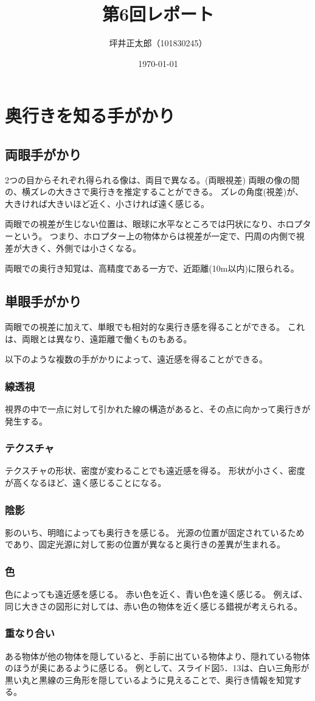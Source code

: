 \documentclass[a4paper,10pt]{jsarticle}
\begin{document}
\title{第6回レポート}
\author{坪井正太郎（101830245）}
\date{\today}
\maketitle
\section{奥行きを知る手がかり}
\subsection{両眼手がかり}
2つの目からそれぞれ得られる像は、両目で異なる。(両眼視差)
両眼の像の間の、横ズレの大きさで奥行きを推定することができる。
ズレの角度(視差)が、大きければ大きいほど近く、小さければ遠く感じる。

両眼での視差が生じない位置は、眼球に水平なところでは円状になり、ホロプターという。
つまり、ホロプター上の物体からは視差が一定で、円周の内側で視差が大きく、外側では小さくなる。

両眼での奥行き知覚は、高精度である一方で、近距離(10m以内)に限られる。

\subsection{単眼手がかり}
両眼での視差に加えて、単眼でも相対的な奥行き感を得ることができる。
これは、両眼とは異なり、遠距離で働くものもある。

以下のような複数の手がかりによって、遠近感を得ることができる。

\subsubsection{線透視}
視界の中で一点に対して引かれた線の構造があると、その点に向かって奥行きが発生する。

\subsubsection{テクスチャ}
テクスチャの形状、密度が変わることでも遠近感を得る。
形状が小さく、密度が高くなるほど、遠く感じることになる。

\subsubsection{陰影}
影のいち、明暗によっても奥行きを感じる。
光源の位置が固定されているためであり、固定光源に対して影の位置が異なると奥行きの差異が生まれる。

\subsubsection{色}
色によっても遠近感を感じる。
赤い色を近く、青い色を遠く感じる。
例えば、同じ大きさの図形に対しては、赤い色の物体を近く感じる錯視が考えられる。

\subsubsection{重なり合い}
ある物体が他の物体を隠していると、手前に出ている物体より、隠れている物体のほうが奥にあるように感じる。
例として、スライド図5．13は、白い三角形が黒い丸と黒線の三角形を隠しているように見えることで、奥行き情報を知覚する。
\end{document}
